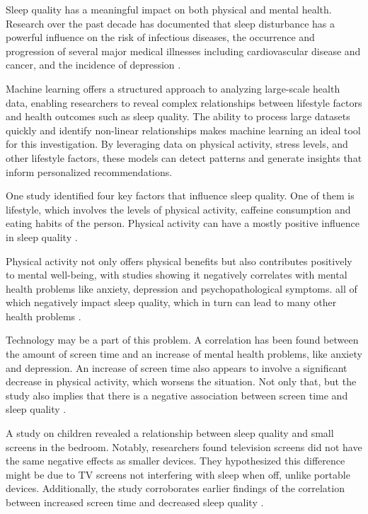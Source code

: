 \documentclass[conference]{IEEEtran}
\begin{document}
Sleep quality has a meaningful impact on both physical and mental health. Research over the past decade has documented that sleep disturbance has a powerful influence on the risk of infectious diseases, the occurrence and progression of several major medical illnesses including cardiovascular disease and cancer, and the incidence of depression \cite{Irwin_2015}.

Machine learning offers a structured approach to analyzing large-scale health data, enabling researchers to reveal complex relationships between lifestyle factors and health outcomes such as sleep quality. The ability to process large datasets quickly and identify non-linear relationships makes machine learning an ideal tool for this investigation. By leveraging data on physical activity, stress levels, and other lifestyle factors, these models can detect patterns and generate insights that inform personalized recommendations.

One study identified four key factors that influence sleep quality. One of them is lifestyle, which involves the levels of physical activity, caffeine consumption and eating habits of the person. Physical activity can have a mostly positive influence in sleep quality \cite{Wang_Biro_2021}.

Physical activity not only offers physical benefits but also contributes positively to mental well-being, with studies showing it negatively correlates with mental health problems like anxiety, depression and psychopathological symptoms. all of which negatively impact sleep quality, which in turn can lead to many other health problems \cite{Wu_Tao_Zhang_Zhang_Tao_2015}.

Technology may be a part of this problem. A correlation has been found between the amount of screen time and an increase of mental health problems, like anxiety and depression. An increase of screen time also appears to involve a significant decrease in physical activity, which worsens the situation. Not only that, but the study also implies that there is a negative association between screen time and sleep quality \cite{Wu_Tao_Zhang_Zhang_Tao_2015}.

A study on children revealed a relationship between sleep quality and small screens in the bedroom. Notably, researchers found television screens did not have the same negative effects as smaller devices. They hypothesized this difference might be due to TV screens not interfering with sleep when off, unlike portable devices. Additionally, the study corroborates earlier findings of the correlation between increased screen time and decreased sleep quality \cite{Kohyama2021}.
\end{document}
